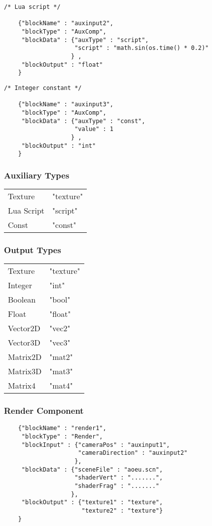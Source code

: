 \begin{lstlisting}
/* Lua script */

    {"blockName" : "auxinput2",  
     "blockType" : "AuxComp",  
     "blockData" : {"auxType" : "script",  
                    "script" : "math.sin(os.time() * 0.2)"  
                   } ,  
     "blockOutput" : "float"  
    }  
\end{lstlisting}

\begin{lstlisting}
/* Integer constant */

    {"blockName" : "auxinput3",  
     "blockType" : "AuxComp",  
     "blockData" : {"auxType" : "const",  
                    "value" : 1  
                   } ,  
     "blockOutput" : "int"  
    }  
\end{lstlisting}

\newpage

\subsubsection{Auxiliary Types}
\begin{tabular}{ l l }
Texture & "texture" \\
Lua Script & "script" \\
Const & "const" \\
\end{tabular}

\subsubsection{Output Types}
\begin{tabular}{ l l }
Texture & "texture" \\
Integer & "int" \\
Boolean & "bool" \\
Float & "float" \\
Vector2D & "vec2" \\
Vector3D & "vec3" \\
Matrix2D & "mat2" \\
Matrix3D & "mat3" \\
Matrix4 & "mat4" \\
\end{tabular}

\subsubsection{Render Component}
\begin{lstlisting}
    {"blockName" : "render1",
     "blockType" : "Render",
     "blockInput" : {"cameraPos" : "auxinput1",
                     "cameraDirection" : "auxinput2"
                    },
     "blockData" : {"sceneFile" : "aoeu.scn",
                    "shaderVert" : ".......",
                    "shaderFrag" : "......."
                   },
     "blockOutput" : {"texture1" : "texture",
                      "texture2" : "texture"}
    }
\end{lstlisting}

